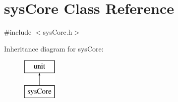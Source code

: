 \hypertarget{classsysCore}{
\section{sysCore Class Reference}
\label{classsysCore}
}


{\ttfamily \#include $<$sysCore.h$>$}

Inheritance diagram for sysCore:\begin{figure}[H]
\begin{center}
\leavevmode
\includegraphics[height=2.000000cm]{classsysCore}
\end{center}
\end{figure}
